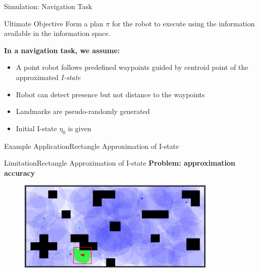 \begin{frame}{Simulation: Navigation Task}
 \begin{block}{Ultimate Objective} 
   Form a plan $\pi$ for the robot to execute using the information available in
   the information space.
 \end{block}

\textbf{In a navigation task, we assume:}
\begin{itemize}
\item A point robot follows predefined waypoints guided by centroid point of the
  approximated \emph{I-state}
\item Robot can detect presence but not distance to the waypoints
\item Landmarks are pseudo-randomly generated
\item Initial I-state $\eta_0$ is given
\end{itemize}
\end{frame}


\begin{frame}{Example Application}{Rectangle Approximation of I-state}
  \begin{center}
  \end{center}
\end{frame}


\begin{frame}{Limitation}{Rectangle Approximation of I-state}
  \textbf{Problem: approximation accuracy}
  \begin{figure}
    \centering
    \includegraphics[width=0.85\textwidth]{figs/rect_clutter}
  \end{figure}
\end{frame}

